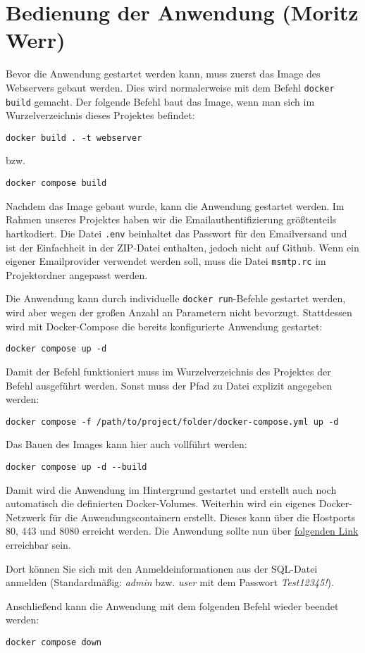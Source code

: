 \chapter{Bedienung der Anwendung (Moritz Werr)}

Bevor die Anwendung gestartet werden kann, muss zuerst das Image des Webservers gebaut werden. Dies wird normalerweise mit dem Befehl  \lstinline|docker build| gemacht. Der folgende Befehl baut das Image, wenn man sich im Wurzelverzeichnis dieses Projektes befindet: 
\begin{verbatim}
docker build . -t webserver
\end{verbatim}

 bzw.
\begin{verbatim}
docker compose build
\end{verbatim}

Nachdem das Image gebaut wurde, kann die Anwendung gestartet werden. Im Rahmen unseres Projektes haben wir die Emailauthentifizierung größtenteils hartkodiert. Die Datei  \lstinline|.env| beinhaltet das Passwort für den Emailversand und ist der Einfachheit in der ZIP-Datei enthalten, jedoch nicht auf Github. Wenn ein eigener Emailprovider verwendet werden soll, muss die Datei  \lstinline|msmtp.rc| im Projektordner angepasst werden.

Die Anwendung kann durch individuelle  \lstinline|docker run|-Befehle gestartet werden, wird aber wegen der großen Anzahl an Parametern nicht bevorzugt. Stattdessen wird mit Docker-Compose die bereits konfigurierte Anwendung gestartet: 
\begin{verbatim} 
docker compose up -d
\end{verbatim}

Damit der Befehl funktioniert muss im Wurzelverzeichnis des Projektes der Befehl ausgeführt werden. Sonst muss der Pfad zu Datei explizit angegeben werden: 
\begin{verbatim} 
docker compose -f /path/to/project/folder/docker-compose.yml up -d
\end{verbatim}
 Das Bauen des Images kann hier auch vollführt werden:  
\begin{verbatim} 
docker compose up -d --build
\end{verbatim}

Damit wird die Anwendung im Hintergrund gestartet und erstellt auch noch automatisch die definierten Docker-Volumes. Weiterhin wird ein eigenes Docker-Netzwerk für die Anwendungscontainern erstellt. Dieses kann über die Hostports 80, 443 und 8080 erreicht werden. Die Anwendung sollte nun über \href{https://localhost/}{folgenden Link} erreichbar sein. 

Dort können Sie sich mit den Anmeldeinformationen aus der SQL-Datei anmelden (Standardmäßig: \textit{admin} bzw. \textit{user} mit dem Passwort \textit{Test12345!}).

Anschließend kann die Anwendung mit dem folgenden Befehl wieder beendet werden: 
\begin{verbatim} 
docker compose down
\end{verbatim}